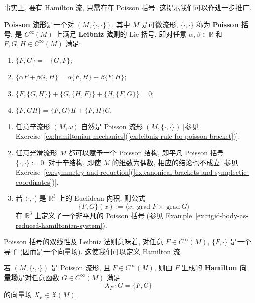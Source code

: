 事实上, 要有 Hamilton 流, 只需存在 Poisson 括号. 这提示我们可以作进一步推广.

\begin{RiemannDefinition}\label{def:poisson-manifold}
\textbf{Poisson 流形}是一个对 $(M,\{\cdot,\cdot\})$, 其中 $M$ 是可微流形, $\{\cdot,\cdot\}$ 称为 \textbf{Poisson 括号}, 是 $C^\infty(M)$ 上满足 \textbf{Leibniz 法则}的 Lie 括号, 即对任意 $\alpha,\beta\in\mathbb{R}$ 和 $F,G,H\in C^\infty(M)$ 满足:
\begin{enumerate}[label=(\roman*),leftmargin=*]
\item $\{F,G\}=-\{G,F\}$;
\item $\{\alpha F+\beta G,H\}=\alpha\{F,H\}+\beta\{F,H\}$;
\item $\{F,\{G,H\}\}+\{G,\{H,F\}\}+\{H,\{F,G\}\}=0$;
\item $\{F,GH\}=\{F,G\}H+\{F,H\}G$.
\end{enumerate}
\end{RiemannDefinition}

\begin{RiemannExample}\label{ex:basic-examples-of-poisson-manifolds}
\begin{enumerate}[label=(\arabic*),ref=\arabic*,leftmargin=*]
\item 任意辛流形 $(M,\omega)$ 自然是 Poisson 流形 $(M,\{\cdot,\cdot\})$ [参见 Exercise~\ref{ex:hamiltonian-mechanics}(\ref{ex:leibniz-rule-for-poisson-bracket})].
\item 任意光滑流形 $M$ 都可以赋予一个 Poisson 结构, 即平凡 Poisson 括号 $\{\cdot,\cdot\}:=0$. 对于辛结构, 即使 $M$ 的维数为偶数, 相应的结论也不成立 [参见 Exercise~\ref{ex:symmetry-and-reduction}(\ref{ex:canonical-brackets-and-symplectic-coordinates})].
\item 若 $\langle\cdot,\cdot\rangle$ 是 $\mathbb{R}^3$ 上的 Euclidean 内积, 则公式
\[
  \{F,G\}(x):=\langle x,\operatorname{grad}F\times\operatorname{grad}G\rangle
\]
在 $\mathbb{R}^3$ 上定义了一个非平凡的 Poisson 括号 (参见 Example~\ref{ex:rigid-body-as-reduced-hamiltonian-system}).
\end{enumerate}
\end{RiemannExample}

Poisson 括号的双线性及 Leibniz 法则意味着, 对任意 $F\in C^\infty(M)$, $\{F,\cdot\}$ 是一个导子 (因而是一个向量场). 这使我们可以定义 Hamilton 流.

\begin{RiemannDefinition}\label{def:hamiltonian-vector-field-on-poisson-manifold}
若 $(M,\{\cdot,\cdot\})$ 是 Poisson 流形, 且 $F\in C^\infty(M)$, 则由 $F$ 生成的 \textbf{Hamilton 向量场}是对任意函数 $G\in C^\infty(M)$ 满足
\[
  X_F\cdot G=\{F,G\}
\]
的向量场 $X_F\in\mathfrak{X}(M)$.
\end{RiemannDefinition}

